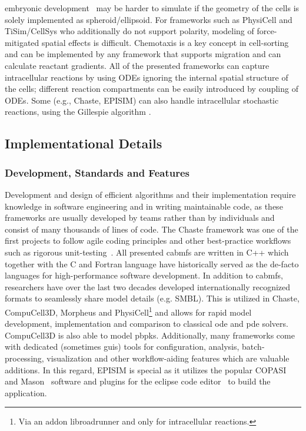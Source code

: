 embryonic development~\cite{Smutny2017} may be harder to simulate
if the geometry of the cells is solely implemented as spheroid/ellipsoid.
For frameworks such as PhysiCell and TiSim/CellSys who additionally do not support
polarity, modeling of force-mitigated spatial effects is difficult.
Chemotaxis is a key concept in cell-sorting~\cite{Vasiev1999} and
can be implemented by any framework that supports migration and can calculate reactant gradients.
All of the presented frameworks can capture intracellular reactions by using ODEs
ignoring the internal spatial structure of the cells; different reaction compartments can
be easily introduced by coupling of ODEs.
Some (e.g., Chaste, EPISIM) can also handle intracellular stochastic reactions, using the
Gillespie algorithm \cite{Gillespie2007}.
%
%
\subsection{Implementational Details}
\label{subsec:abms-technical-details}\noindent
\subsubsection*{Development, Standards and Features}
\label{subsubsec:abms-development}\noindent
Development and design of efficient algorithms and their implementation require knowledge
in software engineering and in writing maintainable code, as these frameworks are usually
developed by teams rather than by individuals and consist of many thousands of lines of code.
The Chaste framework was one of the first projects to follow agile coding principles and
other best-practice workflows such as rigorous unit-testing~\cite{Pitt-francis2008}.
%
All presented \acp{cabmf} are written in C++ which together with the C and Fortran
language have historically served as the de-facto languages for high-performance software
development.
%
In addition to \acp{cabmf}, researchers have over the last two decades developed
internationally recognized formats to seamlessly share model details (e.g. SMBL).
This is utilized in Chaste, CompuCell3D, Morpheus and PhysiCell\footnote{Via an addon
libroadrunner and only for intracellular reactions.} and allows for rapid model
development, implementation and comparison to classical \ac{ode} and \ac{pde} solvers.
CompuCell3D is also able to model \acp{pbpk}.
%
Additionally, many frameworks come with dedicated (sometimes \acp{gui}) tools for
configuration, analysis, batch-processing, visualization and other workflow-aiding
features which are valuable additions.
%
In this regard, EPISIM is special as it utilizes the popular COPASI~\cite{Hoops2006} and
Mason~\cite{Luke2005} software and plugins for the eclipse code
editor~\cite{Burnette2005} to build the application.

